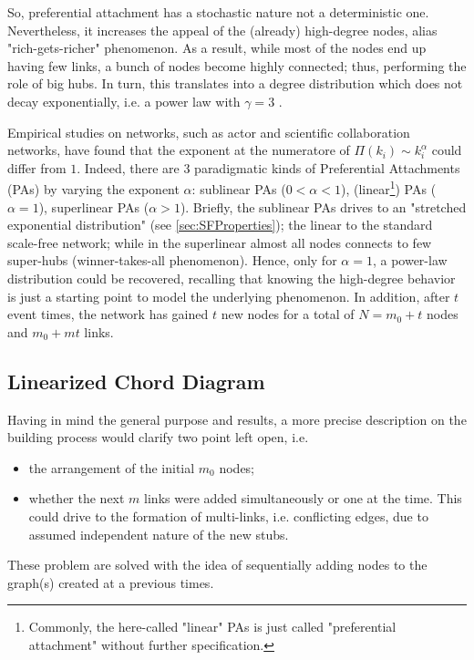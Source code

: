\documentclass[a4paper,10pt,twoside]{book} %
\theoremstyle{definition}
\begin{document}
So, preferential attachment has a stochastic nature not a deterministic one. Nevertheless, it increases the appeal of the (already) high-degree nodes, alias \label{cit:S.Sagone} "rich-gets-richer" phenomenon. As a result, while most of the nodes end up having few links, a bunch of nodes become highly connected; thus, performing the role of big hubs. In turn, this translates into a degree distribution which does not decay exponentially, i.e. a power law with $\gamma = 3$ \cite{barabasi::2016networkbook}. 

Empirical studies on networks, such as actor and scientific collaboration networks, have found that the exponent at the numeratore of $\Pi(k_i) \sim k_i^\alpha$ could differ from $1$.
Indeed, there are $3$ paradigmatic kinds of Preferential Attachments (PAs) by varying the exponent $\alpha$: sublinear PAs ($0<\alpha<1$), (linear\footnote{Commonly, the here-called "linear" PAs is just called "preferential attachment" without further specification.}) PAs ($\alpha = 1$), superlinear PAs ($\alpha>1$). Briefly, the sublinear PAs drives to an "stretched exponential distribution" (see \autoref{sec:SFProperties}); the linear to the standard scale-free network; while in the superlinear almost all nodes connects to few super-hubs (winner-takes-all phenomenon).
Hence, only for $\alpha = 1$, a power-law distribution could be recovered, recalling that knowing the high-degree behavior is just a starting point to model the underlying phenomenon. 
In addition, after $t$ event times, the network has gained $t$ new nodes for a total of $N = m_0 + t$ nodes and $m_0 + mt$ links.

\newpage
\subsection{Linearized Chord Diagram}
Having in mind the general purpose and results, a more precise description on the building process would clarify two point left open, i.e. 
\begin{itemize}
	\item the arrangement of the initial $m_0$ nodes;
	\item whether the next $m$ links were added simultaneously or one at the time. This could drive to the formation of multi-links, i.e. conflicting edges, due to assumed independent nature of the new stubs. 
\end{itemize}

These problem are solved with the idea of sequentially adding nodes to the graph(s) created at a previous times.
\end{document}
